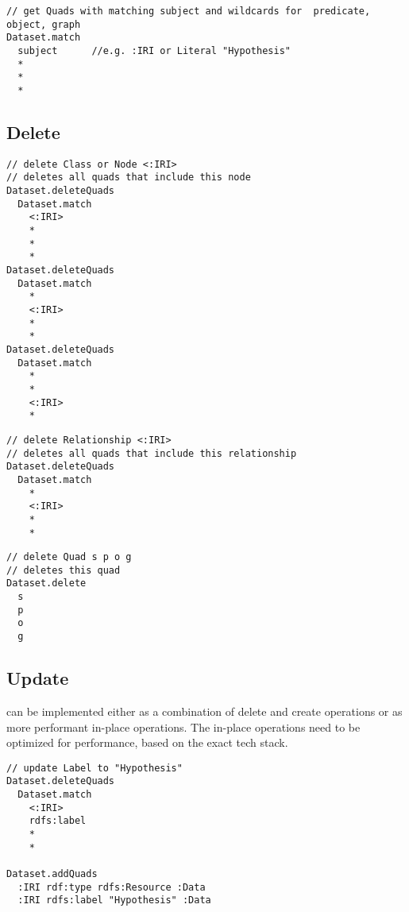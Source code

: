 \begin{lstlisting}
// get Quads with matching subject and wildcards for  predicate, object, graph
Dataset.match
  subject      //e.g. :IRI or Literal "Hypothesis"
  * 
  *
  *

\end{lstlisting}


\subsection*{Delete}  

\begin{lstlisting}
// delete Class or Node <:IRI>
// deletes all quads that include this node
Dataset.deleteQuads
  Dataset.match
    <:IRI> 
    * 
    * 
    *
Dataset.deleteQuads
  Dataset.match
    * 
    <:IRI> 
    * 
    *
Dataset.deleteQuads
  Dataset.match
    * 
    * 
    <:IRI> 
    *

\end{lstlisting}
\begin{lstlisting}
// delete Relationship <:IRI>
// deletes all quads that include this relationship
Dataset.deleteQuads
  Dataset.match
    * 
    <:IRI> 
    * 
    *

\end{lstlisting}

\begin{lstlisting}
// delete Quad s p o g
// deletes this quad
Dataset.delete
  s
  p
  o
  g

\end{lstlisting}

\subsection*{Update} 
can be implemented either as a combination of delete and create operations or as more performant in-place operations. The in-place operations need to be optimized for performance, based on the exact tech stack.

\begin{lstlisting}
// update Label to "Hypothesis"
Dataset.deleteQuads
  Dataset.match
    <:IRI> 
    rdfs:label 
    * 
    *

Dataset.addQuads
  :IRI rdf:type rdfs:Resource :Data
  :IRI rdfs:label "Hypothesis" :Data

\end{lstlisting}


